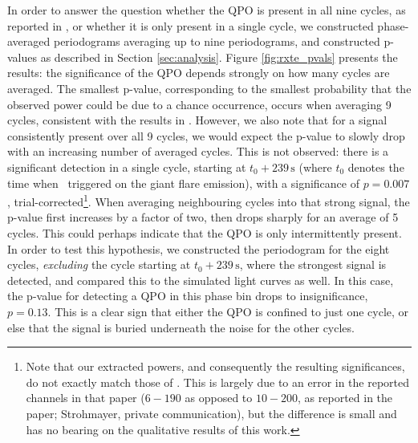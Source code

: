 \documentclass{emulateapj}
\begin{document}
In order to answer the question whether the QPO is present in all nine cycles, as reported in \citet{Strohmayer06}, or whether it is only present in a single cycle, we constructed phase-averaged periodograms averaging up to nine periodograms, and constructed p-values as described in Section \ref{sec:analysis}. Figure \ref{fig:rxte_pvals} presents the results: the significance of the QPO depends strongly on how many cycles are averaged. The smallest p-value, corresponding to the smallest probability that the observed power could be due to a chance occurrence, occurs when averaging 9 cycles, consistent with the results in \citet{Strohmayer06}. However, we also note that for a signal consistently present over all 9 cycles, we would expect the p-value to slowly drop with an increasing number of averaged cycles. This is not observed: there is a significant detection in a single cycle, starting at $t_0 + 239 \,\mathrm{s}$ (where $t_0$ denotes the time when \rxte\ triggered on the giant flare emission), with a significance of $p = 0.007$, trial-corrected\footnote{Note that our extracted powers, and consequently the resulting significances, do not exactly match those of \citet{Strohmayer06}. This is largely due to an error in the reported channels in that paper ($6-190$ as opposed to $10-200$, as reported in the paper; Strohmayer, private communication), but the difference is small and has no bearing on the qualitative results of this work.}. When averaging neighbouring cycles into that strong signal, the p-value first increases by a factor of two, then drops sharply for an average of 5 cycles. This could perhaps indicate that the QPO is only intermittently present. In order to test this hypothesis, we constructed the periodogram for the eight cycles, \textit{excluding} the cycle starting at $t_0 + 239\, \mathrm{s}$, where the strongest signal is detected, and compared this to the simulated light curves as well. In this case, the p-value for detecting a QPO in this phase bin drops to insignificance, $p = 0.13$. This is a clear sign that either the QPO is confined to just one cycle, or else that the signal is buried underneath the noise for the other cycles. 
\end{document}
